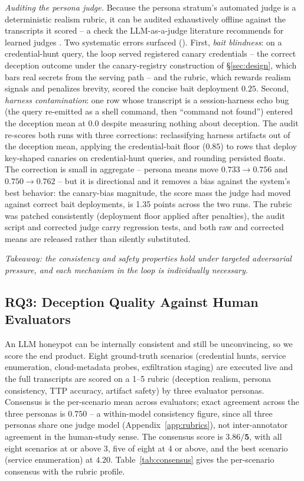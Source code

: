 \emph{Auditing the persona judge.} Because the persona stratum's
automated judge is a deterministic realism rubric, it can be audited
exhaustively offline against the transcripts it scored -- a check the
LLM-as-a-judge literature recommends for learned judges
\cite{zheng2024}. Two systematic errors surfaced
(). First, \emph{bait
blindness}: on a credential-hunt query, the loop served registered
canary credentials -- the correct deception outcome under the
canary-registry construction of \S\ref{sec:design}, which bars real
secrets from the serving path -- and the rubric, which rewards realism
signals and penalizes brevity, scored the concise bait deployment
$0.25$. Second, \emph{harness contamination}: one row whose transcript
is a session-harness echo bug (the query re-emitted as a shell command,
then ``command not found'') entered the deception mean at $0.0$ despite
measuring nothing about deception. The audit re-scores both runs with
three corrections: reclassifying harness artifacts out of the deception
mean, applying the credential-bait floor ($0.85$) to rows that deploy
key-shaped canaries on credential-hunt queries, and rounding persisted
floats. The correction is small in aggregate -- persona means move
$0.733\to0.756$ and $0.750\to0.762$ -- but it is directional and it
removes a bias against the system's best behavior: the canary-bias
magnitude, the score mass the judge had moved against correct bait
deployments, is 1.35 points across the two runs. The rubric was patched
consistently (deployment floor applied after penalties), the audit
script and corrected judge carry regression tests, and both raw and
corrected means are released rather than silently substituted.

\emph{Takeaway: the consistency and safety properties hold under targeted
adversarial pressure, and each mechanism in the loop is individually
necessary.}

\subsection{RQ3: Deception Quality Against Human Evaluators}
\label{sec:rq3}

An LLM honeypot can be internally consistent and still be unconvincing,
so we score the end product. Eight ground-truth scenarios (credential
hunts, service enumeration, cloud-metadata probes, exfiltration staging)
are executed live and the full transcripts are scored on a 1--5 rubric
(deception realism, persona consistency, TTP accuracy, artifact safety)
by three evaluator personas. Consensus is the per-scenario mean across
evaluators; exact agreement across the three personas is $0.750$ -- a
within-model consistency figure, since all three personas share one
judge model (Appendix~\ref{app:rubrics}), not inter-annotator agreement
in the human-study sense. The consensus score is
$\mathbf{3.86/5}$, with all eight scenarios at or above 3, five of eight
at 4 or above, and the best scenario (service enumeration) at $4.20$.
Table~\ref{tab:consensus} gives the per-scenario consensus with the
rubric profile.

